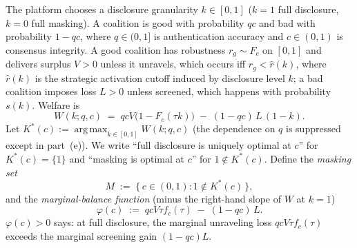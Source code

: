 
The platform chooses a disclosure granularity $k \in [0,1]$ ($k = 1$ full disclosure,
$k = 0$ full masking). A coalition is good with probability $qc$ and bad with
probability $1 - qc$, where $q \in (0,1]$ is authentication accuracy and $c \in (0,1)$
is consensus integrity. A good coalition has robustness $r_g \sim F_c$ on $[0,1]$ and
delivers surplus $V > 0$ unless it unravels, which occurs iff $r_g < \hat r(k)$, where
$\hat r(k)$ is the strategic activation cutoff induced by disclosure level $k$; a bad
coalition imposes loss $L > 0$ unless screened, which happens with probability $s(k)$.
Welfare is
\begin{equation}
W(k; q, c) \;=\; qcV\bigl(1 - F_c(\tau k)\bigr) \;-\; (1 - qc)\,L\,(1 - k).
\tag{W}\label{eq:Wband}
\end{equation}
Let $K^*(c) := \operatorname*{arg\,max}_{k \in [0,1]} W(k; q, c)$ (the dependence on
$q$ is suppressed except in part~(e)). We write ``full disclosure is uniquely optimal
at $c$'' for $K^*(c) = \{1\}$ and ``masking is optimal at $c$'' for $1 \notin K^*(c)$.
Define the \emph{masking set}
\[
M \;:=\; \{\, c \in (0,1) : 1 \notin K^*(c) \,\},
\]
and the \emph{marginal-balance function} (minus the right-hand slope of $W$ at $k = 1$)
\begin{equation}
\varphi(c) \;:=\; qcV\tau f_c(\tau) \;-\; (1 - qc)\,L.
\tag{$\varphi$}\label{eq:phi}
\end{equation}
$\varphi(c) > 0$ says: at full disclosure, the marginal unraveling loss
$qcV\tau f_c(\tau)$ exceeds the marginal screening gain $(1 - qc)L$.

